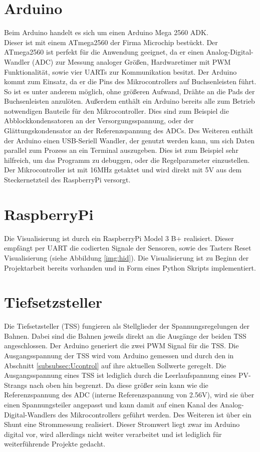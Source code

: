 \documentclass[a4paper, 11pt]{report}
\begin{document}
	\section{Arduino}
		Beim Arduino handelt es sich um einen Arduino Mega 2560 ADK.\\
		Dieser ist mit einem ATmega2560 der Firma Microchip bestückt.
		Der ATmega2560 ist perfekt für die Anwendung geeignet, da er einen Analog-Digital-Wandler (ADC) zur Messung analoger Größen, Hardwaretimer mit PWM Funktionalität, sowie  vier UARTs zur Kommunikation besitzt.
Der Arduino kommt zum Einsatz, da er die Pins des Mikrocontrollers auf Buchsenleisten führt. So ist es unter anderem möglich, ohne größeren Aufwand, Drähte an die Pads der Buchsenleisten anzulöten. Außerdem enthält ein Arduino bereits alle zum Betrieb notwendigen Bauteile für den Mikrocontroller.
Dies sind zum Beispiel die Abblockkondensatoren an der Versorgungsspannung, oder der Glättungskondensator an der Referenzspannung des ADCs.
Des Weiteren enthält der Arduino einen USB-Seriell Wandler, der genutzt werden kann, um sich Daten parallel zum Prozess an ein Terminal auszugeben.
Dies ist zum Beispiel sehr hilfreich, um das Programm zu debuggen, oder die Regelparameter einzustellen.
Der Mikrocontroller ist mit 16MHz getaktet und wird direkt mit 5V aus dem Steckernetzteil des RaspberryPi versorgt.
	\section{RaspberryPi}
		Die Visualisierung ist durch ein RaspberryPi Model 3 B+ realisiert. Dieser empfängt per UART die codierten Signale der Sensoren, sowie des Tasters \glqq Reset Visualisierung\grqq{} (siehe Abbildung \ref{img:hid}).
		Die Visualisierung ist zu Beginn der Projektarbeit bereits vorhanden und in Form eines Python Skripts implementiert.
	\section{Tiefsetzsteller}
		Die Tiefsetzsteller (TSS) fungieren als Stellglieder der Spannungsregelungen der Bahnen.
		Dabei sind die Bahnen jeweils direkt an die Ausgänge der beiden TSS angeschlossen.
	  Der Arduino generiert die zwei PWM Signal für die TSS.
		Die Ausgangsspannung der TSS wird vom Arduino gemessen und durch den in Abschnitt \ref{subsubsec:Ucontrol} auf ihre aktuellen Sollwerte geregelt.
		Die Ausgangsspannung eines TSS ist lediglich durch die Leerlaufspannung eines PV-Strangs%
		nach oben hin begrenzt.
		Da diese größer sein kann wie die Referenzspannung des ADC (interne Referenzspannung von 2.56V), wird sie über einen Spannungsteiler angepasst und kann damit auf einen Kanal des Analog-Digital-Wandlers des Mikrocontrollers geführt werden.
		Des Weiteren ist über ein Shunt eine Strommessung realisiert.
		Dieser Stromwert liegt zwar im Arduino digital vor, wird allerdings nicht weiter
		verarbeitet und ist lediglich für weiterführende Projekte gedacht.
\end{document}
